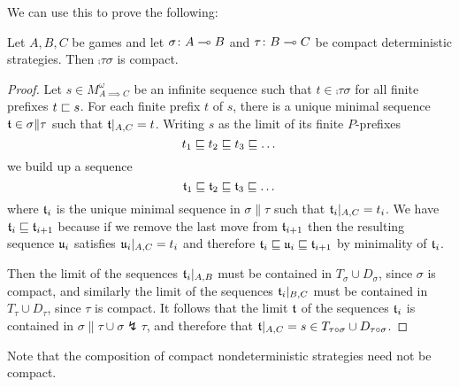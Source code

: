 \documentclass{entcs} \usepackage{prentcsmacro}
\newcommand{\dv}{{\lightning}}
\newcommand{\0}{{\mathtt{0}}}
\begin{document}
We can use this to prove the following:

\begin{proposition}
  Let $A,B,C$ be games and let $\sigma\colon A\multimap B$ and $\tau\colon B\multimap C$ be compact deterministic strategies.  Then $\comp\tau\sigma$ is compact.
\end{proposition}
  \begin{proof}
    Let $s\in M_{A\implies C}^\omega$ be an infinite sequence such that $t\in\comp\tau\sigma$ for all finite prefixes $t\sqsubset s$.  For each finite prefix $t$ of $s$, there is a unique minimal sequence $\mathfrak t\in\sigma\|\tau$ such that $\mathfrak t\vert_{A,C}=t$.  Writing $s$ as the limit of its finite $P$-prefixes
    \[
      t_1 \sqsubseteq t_2 \sqsubseteq t_3 \sqsubseteq \dots
      \]
    we build up a sequence
    \[
      \mathfrak t_1 \sqsubseteq \mathfrak t_2 \sqsubseteq \mathfrak t_3 \sqsubseteq \dots
      \]
    where $\mathfrak t_i$ is the unique minimal sequence in $\sigma\|\tau$ such that $\mathfrak t_i\vert_{A,C}=t_i$.  We have $\mathfrak t_i\sqsubseteq\mathfrak t_{i+1}$ because if we remove the last move from $\mathfrak t_{i+1}$ then the resulting sequence $\mathfrak u_i$ satisfies $\mathfrak u_i\vert_{A,C}=t_i$ and therefore $\mathfrak t_i\sqsubseteq\mathfrak u_i\sqsubseteq\mathfrak t_{i+1}$ by minimality of $\mathfrak t_i$.  

    Then the limit of the sequences $\mathfrak t_i\vert_{A,B}$ must be contained in $T_\sigma\cup D_\sigma$, since $\sigma$ is compact, and similarly the limit of the sequences $\mathfrak t_i\vert_{B,C}$ must be contained in $T_\tau\cup D_\tau$, since $\tau$ is compact.  It follows that the limit $\mathfrak t$ of the sequences $\mathfrak t_i$ is contained in $\sigma\|\tau\cup\sigma\dv\tau$, and therefore that $\mathfrak t\vert_{A,C}=s\in T_{\tau \circ \sigma}\cup D_{\tau \circ \sigma}$.
  \end{proof}

Note that the composition of compact nondeterministic strategies need not be compact.
\end{document}
